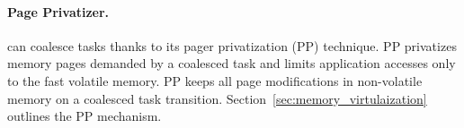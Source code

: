 \paragraph{Page Privatizer.}
\sys can coalesce tasks thanks to its pager privatization (PP) technique. PP privatizes memory pages demanded by a coalesced task and limits application accesses only to the fast volatile memory. PP keeps all page modifications in non-volatile memory on a coalesced task transition. Section~\ref{sec:memory_virtulaization} outlines the PP mechanism.

